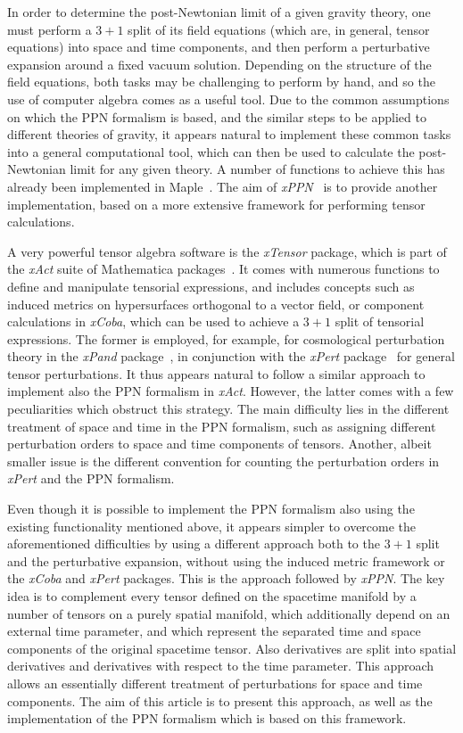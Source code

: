 \documentclass[notitlepage,a4paper,aps,prd,onecolumn,superscriptaddress,nofootinbib,groupedaddress,longbibliography]{revtex4-1}
\newcommand{\xPPN}{\emph{xPPN}}
\newcommand{\xAct}{\emph{xAct}}
\newcommand{\xTensor}{\emph{xTensor}}
\newcommand{\xPert}{\emph{xPert}}
\newcommand{\xPand}{\emph{xPand}}
\newcommand{\xCoba}{\emph{xCoba}}
\begin{document}
In order to determine the post-Newtonian limit of a given gravity theory, one must perform a $3+1$ split of its field equations (which are, in general, tensor equations) into space and time components, and then perform a perturbative expansion around a fixed vacuum solution. Depending on the structure of the field equations, both tasks may be challenging to perform by hand, and so the use of computer algebra comes as a useful tool. Due to the common assumptions on which the PPN formalism is based, and the similar steps to be applied to different theories of gravity, it appears natural to implement these common tasks into a general computational tool, which can then be used to calculate the post-Newtonian limit for any given theory. A number of functions to achieve this has already been implemented in Maple~\cite{Puetzfeld:2006qq}. The aim of \xPPN~\cite{xppn} is to provide another implementation, based on a more extensive framework for performing tensor calculations.

A very powerful tensor algebra software is the \xTensor{} package, which is part of the \xAct{} suite of Mathematica packages~\cite{xact}. It comes with numerous functions to define and manipulate tensorial expressions, and includes concepts such as induced metrics on hypersurfaces orthogonal to a vector field, or component calculations in \xCoba, which can be used to achieve a $3+1$ split of tensorial expressions. The former is employed, for example, for cosmological perturbation theory in the \xPand{} package~\cite{Pitrou:2013hga}, in conjunction with the \xPert{} package~\cite{Brizuela:2008ra} for general tensor perturbations. It thus appears natural to follow a similar approach to implement also the PPN formalism in \xAct. However, the latter comes with a few peculiarities which obstruct this strategy. The main difficulty lies in the different treatment of space and time in the PPN formalism, such as assigning different perturbation orders to space and time components of tensors. Another, albeit smaller issue is the different convention for counting the perturbation orders in \xPert{} and the PPN formalism.

Even though it is possible to implement the PPN formalism also using the existing functionality mentioned above, it appears simpler to overcome the aforementioned difficulties by using a different approach both to the $3+1$ split and the perturbative expansion, without using the induced metric framework or the \xCoba{} and \xPert{} packages. This is the approach followed by \xPPN. The key idea is to complement every tensor defined on the spacetime manifold by a number of tensors on a purely spatial manifold, which additionally depend on an external time parameter, and which represent the separated time and space components of the original spacetime tensor. Also derivatives are split into spatial derivatives and derivatives with respect to the time parameter. This approach allows an essentially different treatment of perturbations for space and time components. The aim of this article is to present this approach, as well as the implementation of the PPN formalism which is based on this framework.
\end{document}
